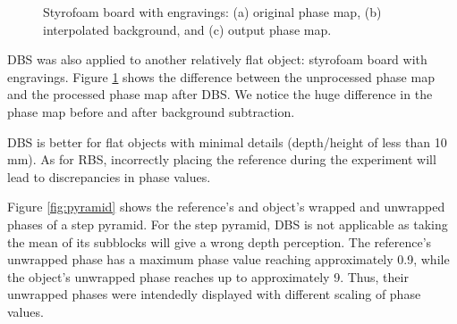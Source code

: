 \begin{figure}[h!]
	\centering
	\caption[Phase maps of styrofoam board with engravings]{Styrofoam board with engravings: (a) original phase map, (b) interpolated background, and (c) output phase map.}
	\label{fig:styroV}
\end{figure}

DBS was also applied to another relatively flat object: styrofoam board with engravings. Figure \ref{fig:styroV} shows the difference between the unprocessed phase map and the processed phase map after DBS. We notice the huge difference in the phase map before and after background subtraction.

DBS is better for flat objects with minimal details (depth/height of less than 10 mm). As for RBS, incorrectly placing the reference during the experiment will lead to discrepancies in phase values.

Figure \ref{fig:pyramid} shows the reference's and object's wrapped and unwrapped phases of a step pyramid. For the step pyramid, DBS is not applicable as taking the mean of its subblocks will give a wrong depth perception. The reference's unwrapped phase has a maximum phase value reaching approximately 0.9, while the object's unwrapped phase reaches up to approximately 9. Thus, their unwrapped phases were intendedly displayed with different scaling of phase values. 

